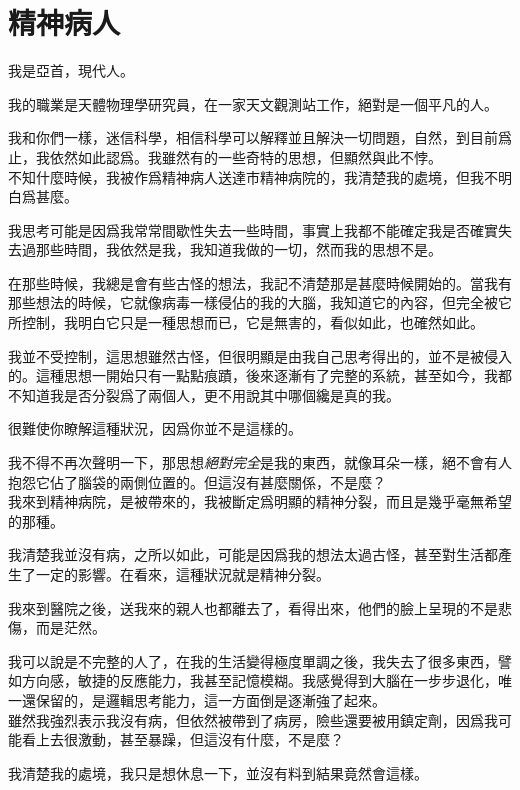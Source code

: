 \chapter{精神病人}
我是亞首，現代人。

我的職業是天體物理學研究員，在一家天文觀測站工作，絕對是一個平凡的人。

我和你們一樣，迷信科學，相信科學可以解釋並且解決一切問題，自然，到目前爲止，我依然如此認爲。我雖然有的一些奇特的思想，但顯然與此不悖。
\\


不知什麼時候，我被作爲精神病人送達市精神病院的，我清楚我的處境，但我不明白爲甚麼。

我思考可能是因爲我常常間歇性失去一些時間，事實上我都不能確定我是否確實失去過那些時間，我依然是我，我知道我做的一切，然而我的思想不是。

在那些時候，我總是會有些古怪的想法，我記不清楚那是甚麼時候開始的。當我有那些想法的時候，它就像病毒一樣侵佔的我的大腦，我知道它的內容，但完全被它所控制，我明白它只是一種思想而已，它是無害的，看似如此，也確然如此。

我並不受控制，這思想雖然古怪，但很明顯是由我自己思考得出的，並不是被侵入的。這種思想一開始只有一點點痕蹟，後來逐漸有了完整的系統，甚至如今，我都不知道我是否分裂爲了兩個人，更不用說其中哪個纔是真的我。

很難使你瞭解這種狀況，因爲你並不是這樣的。

我不得不再次聲明一下，那思想\emph{絕對完全}是我的東西，就像耳朵一樣，絕不會有人抱怨它佔了腦袋的兩側位置的。但這沒有甚麼關係，不是麼？
\\


我來到精神病院，是被帶來的，我被斷定爲明顯的精神分裂，而且是幾乎毫無希望的那種。

我清楚我並沒有病，之所以如此，可能是因爲我的想法太過古怪，甚至對生活都產生了一定的影響。在看來，這種狀況就是精神分裂。

我來到醫院之後，送我來的親人也都離去了，看得出來，他們的臉上呈現的不是悲傷，而是茫然。

我可以說是不完整的人了，在我的生活變得極度單調之後，我失去了很多東西，譬如方向感，敏捷的反應能力，我甚至記憶模糊。我感覺得到大腦在一步步退化，唯一還保留的，是邏輯思考能力，這一方面倒是逐漸強了起來。
\\


雖然我強烈表示我沒有病，但依然被帶到了病房，險些還要被用鎮定劑，因爲我可能看上去很激動，甚至暴躁，但這沒有什麼，不是麼？

我清楚我的處境，我只是想休息一下，並沒有料到結果竟然會這樣。

